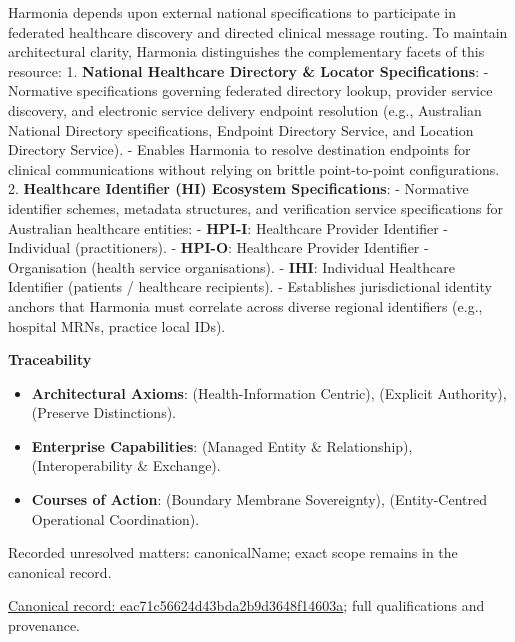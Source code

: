 Harmonia depends upon external national specifications to participate in federated healthcare discovery and directed clinical message routing. To maintain architectural clarity, Harmonia distinguishes the complementary facets of this resource:
1. \textbf{National Healthcare Directory \& Locator Specifications}:
   - Normative specifications governing federated directory lookup, provider service discovery, and electronic service delivery endpoint resolution (e.g., Australian National Directory specifications, Endpoint Directory Service, and Location Directory Service).
   - Enables Harmonia to resolve destination endpoints for clinical communications without relying on brittle point-to-point configurations.
2. \textbf{Healthcare Identifier (HI) Ecosystem Specifications}:
   - Normative identifier schemes, metadata structures, and verification service specifications for Australian healthcare entities:
     - \textbf{HPI-I}: Healthcare Provider Identifier - Individual (practitioners).
     - \textbf{HPI-O}: Healthcare Provider Identifier - Organisation (health service organisations).
     - \textbf{IHI}: Individual Healthcare Identifier (patients / healthcare recipients).
   - Establishes jurisdictional identity anchors that Harmonia must correlate across diverse regional identifiers (e.g., hospital MRNs, practice local IDs).



\par\medskip\textbf{Traceability}\par


\begin{itemize}


\item \textbf{Architectural Axioms}: \texttt{} (Health-Information Centric), \texttt{} (Explicit Authority), \texttt{} (Preserve Distinctions).

\item \textbf{Enterprise Capabilities}: \texttt{} (Managed Entity \& Relationship), \texttt{} (Interoperability \& Exchange).

\item \textbf{Courses of Action}: \texttt{} (Boundary Membrane Sovereignty), \texttt{} (Entity-Centred Operational Coordination).

\end{itemize}

{\small Recorded unresolved matters: canonicalName; exact scope remains in the canonical record.}\par
{\footnotesize \href{../../../../continuum/strategy/resource/eac71c56624d43bda2b9d3648f14603a.md}{Canonical record: eac71c56624d43bda2b9d3648f14603a}; full qualifications and provenance.}\par
